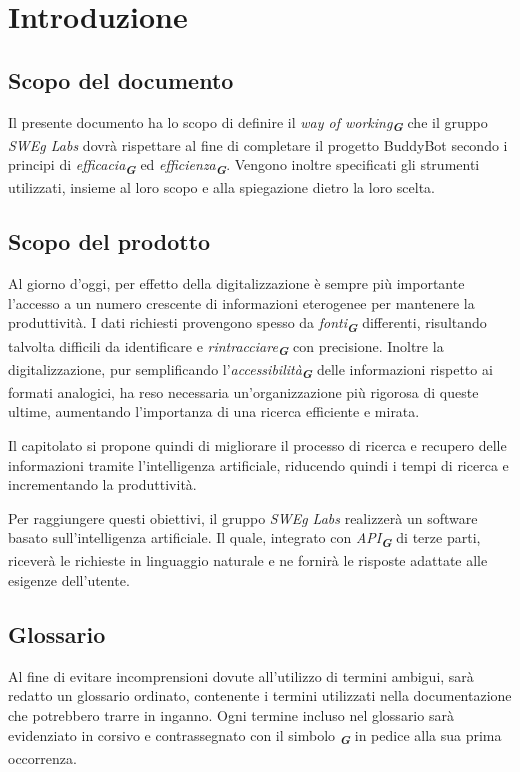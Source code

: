 


\section{Introduzione}
\label{sec:introduzione}

\subsection{Scopo del documento}
Il presente documento ha lo scopo di definire il \emph{way of working}\textsubscript{\textit{\textbf{G}}} che il gruppo \emph{SWEg Labs} dovrà rispettare al fine di completare il progetto BuddyBot secondo i principi di \emph{efficacia}\textsubscript{\textit{\textbf{G}}} ed \emph{efficienza}\textsubscript{\textit{\textbf{G}}}.
Vengono inoltre specificati gli strumenti utilizzati, insieme al loro scopo e alla spiegazione dietro la loro scelta.
\subsection{Scopo del prodotto}
Al giorno d'oggi, per effetto della digitalizzazione è sempre più importante l'accesso a un numero crescente di informazioni eterogenee per mantenere la produttività. I dati richiesti provengono spesso da  \emph{fonti}\textsubscript{\textit{\textbf{G}}} differenti, risultando talvolta difficili da identificare e  \emph{rintracciare}\textsubscript{\textit{\textbf{G}}} con precisione. Inoltre la digitalizzazione, pur semplificando l'\emph{accessibilità}\textsubscript{\textit{\textbf{G}}} delle informazioni rispetto ai formati analogici, ha reso necessaria un'organizzazione più rigorosa di queste ultime, aumentando l'importanza di una ricerca efficiente e mirata.

Il capitolato si propone quindi di migliorare il processo di ricerca e recupero delle informazioni tramite l'intelligenza artificiale, riducendo quindi i tempi di ricerca e incrementando la produttività.

Per raggiungere questi obiettivi, il gruppo \emph{SWEg Labs} realizzerà un software basato sull'intelligenza artificiale. Il quale, integrato con \emph{API}\textsubscript{\textit{\textbf{G}}} di terze parti, riceverà le richieste in linguaggio naturale e ne fornirà le risposte adattate alle esigenze dell'utente.
\subsection{Glossario}
Al fine di evitare incomprensioni dovute all'utilizzo di termini ambigui, sarà redatto un glossario ordinato, contenente i termini utilizzati nella documentazione che potrebbero trarre in inganno. Ogni termine incluso nel glossario sarà evidenziato in corsivo e contrassegnato con il simbolo \textsubscript{\textit{\textbf{G}}} in pedice alla sua prima occorrenza.

